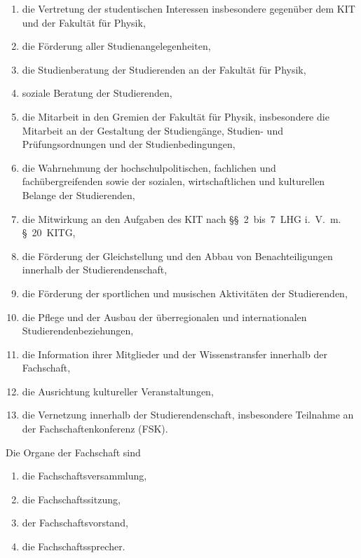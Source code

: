 \documentclass[a4paper, parskip=half, numbers=noenddot]{scrartcl}
\begin{document}
\begin{contract}
\begin{enumerate}
\item die Vertretung der studentischen Interessen insbesondere gegenüber dem KIT und der Fakultät für Physik,
\item die Förderung aller Studienangelegenheiten,
\item die Studienberatung der Studierenden an der Fakultät für Physik,
\item soziale Beratung der Studierenden,
\item die Mitarbeit in den Gremien der Fakultät für Physik, insbesondere die Mitarbeit an der Gestaltung der Studiengänge, Studien- und Prüfungsordnungen und der Studienbedingungen,
\item die Wahrnehmung der hochschulpolitischen, fachlichen und fachübergreifenden sowie der sozialen, wirtschaftlichen und kulturellen Belange der Studierenden,
\item die Mitwirkung an den Aufgaben des KIT nach §§~2~bis~7~LHG i.~V.~m. §~20~KITG,
\item die Förderung der Gleichstellung und den Abbau von Benachteiligungen innerhalb der Studierendenschaft,
\item die Förderung der sportlichen und musischen Aktivitäten der Studierenden,
\item die Pflege und der Ausbau der überregionalen und internationalen Studierendenbeziehungen,
\item die Information ihrer Mitglieder und der Wissenstransfer innerhalb der Fachschaft,
\item die Ausrichtung kultureller Veranstaltungen,
\item die Vernetzung innerhalb der Studierendenschaft, insbesondere Teilnahme an der Fachschaftenkonferenz (FSK).
\end{enumerate}


\pagebreak

%
%


Die Organe der Fachschaft sind

  \begin{enumerate}
  \item die Fachschaftsversammlung,
  \item die Fachschaftssitzung,
  \item der Fachschaftsvorstand,
  \item die Fachschaftssprecher.
  \end{enumerate}



\end{contract}
\end{document}
